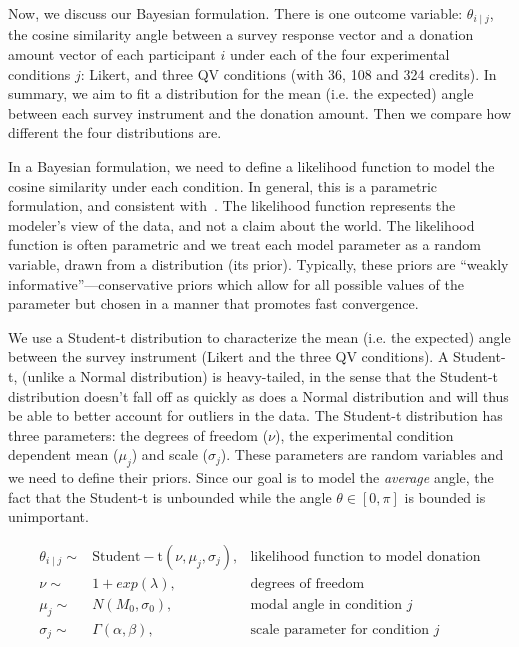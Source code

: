 Now, we discuss our Bayesian formulation. There is one outcome variable: $\theta_{i \mid j}$, the cosine similarity angle between a survey response vector and a donation amount vector of each participant $i$  under each of the four experimental conditions $j$: Likert, and three QV conditions (with 36, 108 and 324 credits). In summary, we aim to fit a distribution for the mean (i.e. the expected) angle between each survey instrument and the donation amount. Then we compare how different the four distributions are. 

In a Bayesian formulation, we need to define a likelihood function to model the cosine similarity under each condition. In general, this is a parametric formulation, and consistent with~\textcite{McElreath2015}. The likelihood function represents the modeler's view of the data, and not a claim about the world. The likelihood function is often parametric and we treat each model parameter as a random variable, drawn from a distribution (its prior). Typically, these priors are ``weakly informative''---conservative priors which allow for all possible values of the parameter but chosen in a manner that promotes fast convergence.


We use a Student-t distribution to characterize the mean (i.e. the expected) angle between the survey instrument (Likert and the three QV conditions). A Student-t, (unlike a Normal distribution) is heavy-tailed, in the sense that the Student-t distribution doesn't fall off as quickly as does a Normal distribution and will thus be able to better account for outliers in the data. The Student-t distribution has three parameters: the degrees of freedom ($\nu$), the experimental condition dependent mean ($\mu_j$) and scale ($\sigma_j$).  These parameters are random variables and we need to define their priors. Since our goal is to model the \textit{average} angle, the fact that the Student-t is unbounded while the angle $\theta \in [0, \pi]$ is bounded is unimportant.

\begin{align}
  \theta_{i \mid j} \sim & \mathrm{Student-t}(\nu, \mu_j, \sigma_j),   & \text{likelihood function to model donation} \label{eq:bayesian formulation} \\
  \nu \sim & 1 + exp(\lambda), & \text{degrees of freedom} \\
  \mu_j \sim & N(M_0, \sigma_0), & \text{modal angle in condition } j \\
  \sigma_j \sim & \Gamma(\alpha, \beta), & \text{scale parameter for condition } j
\end{align}
 
